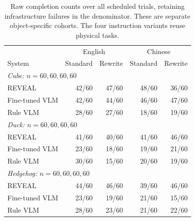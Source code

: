 \begin{table}[t]
\centering\footnotesize
\setlength{\tabcolsep}{2pt}
\begin{tabular}{@{}lrrrr@{}}
\toprule
 & \multicolumn{2}{c}{English} & \multicolumn{2}{c}{Chinese}\\
System & Standard & Rewrite & Standard & Rewrite\\
\midrule
\multicolumn{5}{l}{\textit{Cube: $n=60, 60, 60, 60$}}\\
REVEAL & 42/60 & 47/60 & 48/60 & 36/60\\
Fine-tuned VLM & 42/60 & 44/60 & 46/60 & 47/60\\
Rule VLM & 28/60 & 27/60 & 18/60 & 19/60\\
\midrule
\multicolumn{5}{l}{\textit{Duck: $n=60, 60, 60, 60$}}\\
REVEAL & 41/60 & 40/60 & 41/60 & 46/60\\
Fine-tuned VLM & 23/60 & 18/60 & 19/60 & 21/60\\
Rule VLM & 30/60 & 15/60 & 20/60 & 19/60\\
\midrule
\multicolumn{5}{l}{\textit{Hedgehog: $n=60, 60, 60, 60$}}\\
REVEAL & 44/60 & 46/60 & 39/60 & 46/60\\
Fine-tuned VLM & 23/60 & 19/60 & 21/60 & 15/60\\
Rule VLM & 28/60 & 23/60 & 21/60 & 22/60\\
\bottomrule
\end{tabular}
\caption{Raw completion counts over all scheduled trials, retaining infrastructure failures in the denominator. These are separate object-specific cohorts. The four instruction variants reuse physical tasks.}
\label{tab:language-raw}
\end{table}
